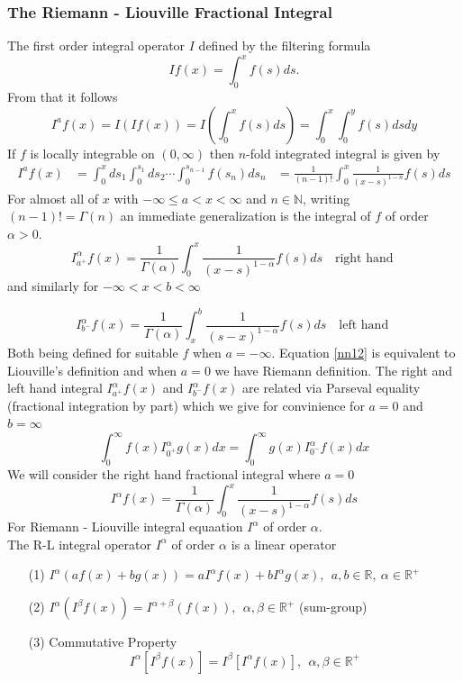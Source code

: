 \documentclass[a4 paper, 12pt]{report}
\theoremstyle{plain}
\begin{document}
\subsubsection{The Riemann - Liouville Fractional Integral}
\noindent
\par The first order integral operator $I$ defined by the filtering formula
$$
If(x) = \int_0^xf(s)ds.
$$
From that it follows
$$
I^af(x) = I(If(x)) = I(\int_0^xf(s)ds) = \int_0^x\int_0^yf(s)dsdy
$$
If $f$ is locally integrable on $(0,\infty)$ then $n$-fold integrated integral is given by
\begin{align*}
I^af(x) & = \int_0^xds_1\int_0^{s_1}ds_2\cdots\int_0^{s_{n-1}}f(s_n)ds_n
& = \frac{1}{(n-1)!}\int_0^x\frac{1}{(x-s)^{1-n}}f(s)ds
\end{align*}
For almost all of $x$ with $-\infty\leq a <x<\infty$ and $n\in\mathbb{N}$, writing $(n-1)! = \Gamma(n)$ an immediate generalization is the integral of $f$ of order $\alpha>0$.
\begin{equation}\label{nn12}
I^\alpha_{a^+} f(x) = \frac{1}{\Gamma(\alpha)}\int_0^x\frac{1}{(x-s)^{1-\alpha}}f(s)ds~~~\mbox{  right hand  }
\end{equation}
and similarly for $-\infty<x<b<\infty$

\begin{equation}
I^\alpha_{b^-} f(x) = \frac{1}{\Gamma(\alpha)}\int_x^b\frac{1}{(s-x)^{1-\alpha}}f(s)ds~~~\mbox{  left hand  }
\end{equation}
Both being defined for suitable $f$ when $a = -\infty$. Equation \eqref{nn12} is equivalent to Liouville's definition and when $a = 0$ we have Riemann definition. The right and left hand integral $I^\alpha_{a^+}f(x)$ and $I_{b^-}^\alpha f(x)$ are related via Parseval equality (fractional integration by part) which we give for convinience for $a = 0$ and $b = \infty$
$$
\int_0^\infty f(x) I_{0^+}^\alpha g(x)dx = \int_0^\infty g(x) I_{0^-}^\alpha f(x)dx
$$
We will consider the right hand fractional integral where $a = 0$
$$
I^\alpha f(x) = \frac{1}{\Gamma(\alpha)}\int_0^x\frac{1}{(x-s)^{1-\alpha}}f(s)ds
$$
For Riemann - Liouville integral equaation $I^\alpha$ of order $\alpha$.\\
The R-L integral operator $I^\alpha$ of order $\alpha$ is a linear operator
\begin{enumerate}
\item[(1)] $I^\alpha (a f(x) +b g(x)) = aI^\alpha f(x)+b I^\alpha g(x),~~a,b\in\mathbb{R},~\alpha\in\mathbb{R}^+$
\item[(2)] $I^\alpha (I^\beta f(x)) = I^{\alpha+\beta}(f(x)),~~\alpha,\beta\in\mathbb{R}^+$  (sum-group)
\item[(3)] Commutative Property
$$
I^\alpha[I^\beta f(x)] = I^\beta[I^\alpha f(x)],~~\alpha,\beta\in\mathbb{R}^+
$$
\end{enumerate}
\end{document}
